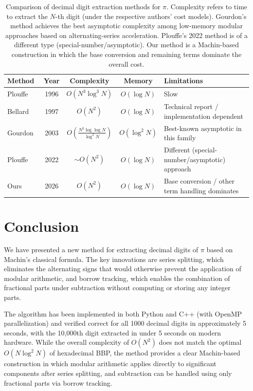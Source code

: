 \documentclass[11pt]{article}
\begin{document}
\begin{table}[h]
\centering
\begin{tabular}{lcccl}
\hline
\textbf{Method} & \textbf{Year} & \textbf{Complexity} & \textbf{Memory} & \textbf{Limitations} \\
\hline
Plouffe~\cite{plouffe1996} & 1996 & $O(N^3 \log^3 N)$ & $O(\log N)$ & Slow \\
Bellard~\cite{bellard1997} & 1997 & $O(N^2)$ & $O(\log N)$ & Technical report / implementation dependent \\
Gourdon~\cite{gourdon2003} & 2003 & $O\!\left(\frac{N^2 \log\log N}{\log^2 N}\right)$ & $O(\log^2 N)$ & Best-known asymptotic in this family \\
Plouffe~\cite{plouffe2022} & 2022 & ${\sim}O(N^2)$ & $O(\log N)$ & Different (special-number/asymptotic) approach \\
Ours & 2026 & $O(N^2)$ & $O(\log N)$ & Base conversion / other term handling dominates \\
\hline
\end{tabular}
\caption{Comparison of decimal digit extraction methods for $\pi$. Complexity refers to time to extract the $N$-th digit (under the respective authors' cost models). Gourdon's method achieves the best asymptotic complexity among low-memory modular approaches based on alternating-series acceleration. Plouffe's 2022 method is of a different type (special-number/asymptotic). Our method is a Machin-based construction in which the base conversion and remaining terms dominate the overall cost.}
\label{tab:comparison}
\end{table}

\section{Conclusion}

We have presented a new method for extracting decimal digits of $\pi$ based on Machin's classical formula. The key innovations are series splitting, which eliminates the alternating signs that would otherwise prevent the application of modular arithmetic, and borrow tracking, which enables the combination of fractional parts under subtraction without computing or storing any integer parts.

The algorithm has been implemented in both Python and C++ (with OpenMP parallelization) and verified correct for all 1000 decimal digits in approximately 5 seconds, with the 10{,}000th digit extracted in under 5 seconds on modern hardware. While the overall complexity of $O(N^2)$ does not match the optimal $O(N \log^2 N)$ of hexadecimal BBP, the method provides a clear Machin-based construction in which modular arithmetic applies directly to significant components after series splitting, and subtraction can be handled using only fractional parts via borrow tracking.
\end{document}

